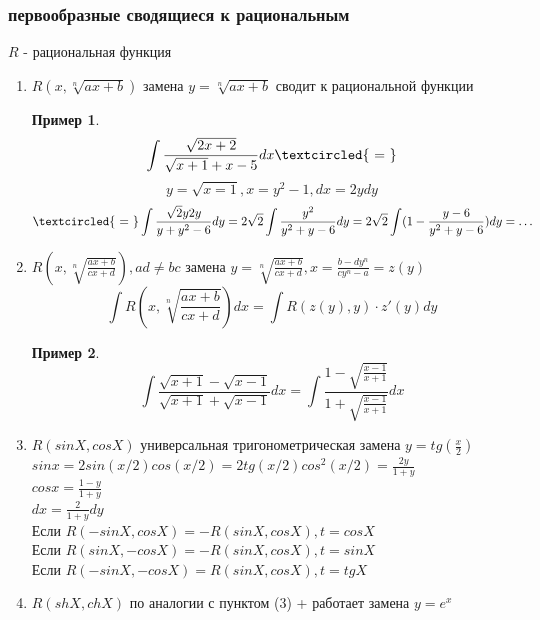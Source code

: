 \documentclass[a4paper]{article}
\theoremstyle{definition}
\newtheorem*{exmp}{Пример}
\newtheorem*{comment}{Замечание}
\numberwithin{theorem}{subsection}
\numberwithin{lemma}{subsection}
\numberwithin{definition}{subsection}
\numberwithin{comment*}{subsection}
\numberwithin{consequence}{subsection}
\numberwithin{property}{subsection}
\begin{document}
\subsubsection{первообразные сводящиеся к рациональным}
$R$ - рациональная функция
\begin{enumerate}
 \item $R(x,\sqrt[n]{ax+b})$ замена $y = \sqrt[n]{ax+b}$ сводит к рациональной функции

       \begin{exmp}
        $$ \int \frac{\sqrt{2x+2}}{\sqrt{x+1} + x - 5} dx \textcircled{\ = \ }$$
        $$ y = \sqrt{x=1}, x = y^2 - 1, dx = 2ydy $$
        $$ \textcircled{\ = \ } \int \frac{\sqrt{2} y 2y}{y + y^2 - 6} dy = 2\sqrt{2} \int \frac{y^2}{y^2+y-6} dy  = 2\sqrt{2} \int (1- \frac{y-6}{y^2+y-6}) dy = \dots$$
       \end{exmp}
 \item $R(x, \sqrt[n]{\frac{ax+b}{cx+d}}), ad \ne bc$ замена $y=\sqrt[n]{\frac{ax+b}{cx+d}}, x = \frac{b - dy^n}{cy^n-a} = z(y)$
       $$ \int R(x, \sqrt[n]{\frac{ax+b}{cx+d}}) dx = \int R(z(y), y)\cdot z'(y) dy$$
       \begin{exmp}
        $$ \int \frac{\sqrt{x+1} - \sqrt{x-1}}{\sqrt{x+1} + \sqrt{x-1}} dx = \int \frac{1 - \sqrt{\frac{x-1}{x+1}}}{1 + \sqrt{\frac{x-1}{x+1}}} dx$$
       \end{exmp}
 \item $R(sinX, cosX)$ универсальная тригонометрическая замена $y = tg(\frac{x}{2})$
       $sinx = 2 sin(x/2)cos(x/2) = 2 tg(x/2) cos^2(x/2) = \frac{2 y}{1+y}$\\
       $cosx= \frac{1-y}{1+y}$ \\
       $dx = \frac{2}{1+y} dy$ \\
       Если $R(-sinX, cosX) = - R(sinX, cosX), t = cosX$\\
       Если $R(sinX, -cosX) = - R(sinX, cosX), t = sinX$\\
       Если $R(-sinX, -cosX) =  R(sinX, cosX), t = tgX$\\
 \item $R(shX, chX)$ по аналогии с пунктом (3) + работает замена $y = e^x$
\end{enumerate}
\end{document}
